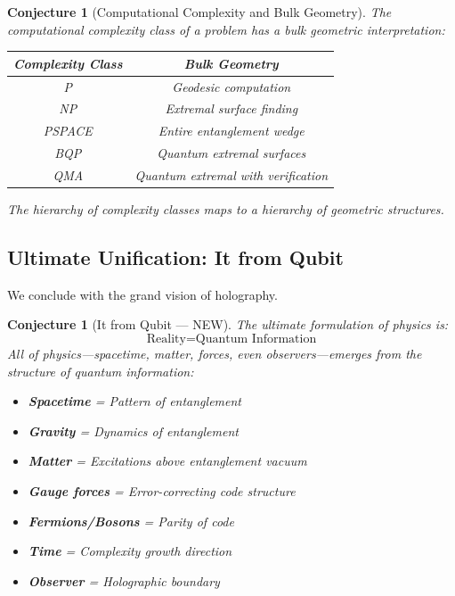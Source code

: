 \documentclass[12pt,a4paper]{article}
\newtheorem{conjecture}[theorem]{Conjecture}
\begin{document}
\begin{conjecture}[Computational Complexity and Bulk Geometry]
The computational complexity class of a problem has a bulk geometric interpretation:
\begin{center}
\renewcommand{\arraystretch}{1.4}
\begin{tabular}{c|c}
\textbf{Complexity Class} & \textbf{Bulk Geometry} \\
\hline
P & Geodesic computation \\
NP & Extremal surface finding \\
PSPACE & Entire entanglement wedge \\
BQP & Quantum extremal surfaces \\
QMA & Quantum extremal with verification
\end{tabular}
\end{center}
The hierarchy of complexity classes maps to a hierarchy of geometric structures.
\end{conjecture}

\subsection{Ultimate Unification: It from Qubit}

We conclude with the grand vision of holography.

\begin{conjecture}[It from Qubit --- NEW]
The ultimate formulation of physics is:
\begin{equation}
\boxed{\text{Reality} = \text{Quantum Information}}
\end{equation}
All of physics---spacetime, matter, forces, even observers---emerges from the structure of quantum information:
\begin{itemize}
    \item \textbf{Spacetime} = Pattern of entanglement
    \item \textbf{Gravity} = Dynamics of entanglement  
    \item \textbf{Matter} = Excitations above entanglement vacuum
    \item \textbf{Gauge forces} = Error-correcting code structure
    \item \textbf{Fermions/Bosons} = Parity of code
    \item \textbf{Time} = Complexity growth direction
    \item \textbf{Observer} = Holographic boundary
\end{itemize}
\end{conjecture}
\end{document}
